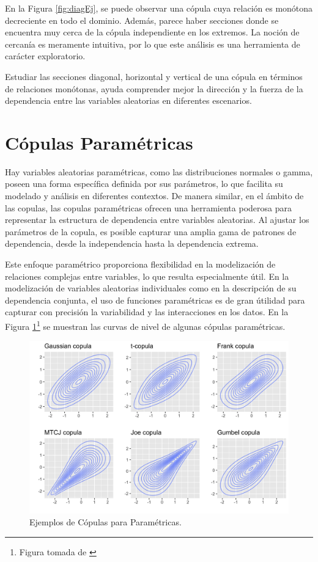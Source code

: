 En la Figura \ref{fig:diagEj}, se puede observar una cópula cuya relación es monótona decreciente en todo el dominio. Además, parece haber secciones donde se encuentra muy cerca de la cópula independiente en los extremos. La noción de cercanía es meramente intuitiva, por lo que este análisis es una herramienta de carácter exploratorio.

Estudiar las secciones diagonal, horizontal y vertical de una cópula en términos de relaciones monótonas, ayuda comprender mejor la dirección y la fuerza de la dependencia entre las variables aleatorias en diferentes escenarios. 




\section{Cópulas Paramétricas}

Hay variables aleatorias paramétricas, como las distribuciones normales o gamma, poseen una forma específica definida por sus parámetros, lo que facilita su modelado y análisis en diferentes contextos. De manera similar, en el ámbito de las copulas, las copulas paramétricas ofrecen una herramienta poderosa para 
representar la estructura de dependencia entre variables aleatorias. Al ajustar los parámetros de la copula, es posible capturar una amplia gama de patrones de dependencia, desde la independencia hasta la dependencia extrema. 

Este enfoque paramétrico proporciona flexibilidad en la modelización de relaciones complejas entre variables, lo que resulta especialmente útil. En la modelización de variables aleatorias individuales como en la descripción de su dependencia conjunta, el uso de funciones paramétricas es de gran útilidad para capturar con precisión la variabilidad y las interacciones en los datos. En la Figura \ref{fig:Parametric}\footnote{Figura tomada de \cite{ImgCopulas}} se muestran las curvas de nivel de algunas cópulas paramétricas.

\begin{figure}[H]
    \centering
    \includegraphics[width = 0.7 \textwidth]{Imagenes/parametricCopulas.png}
    \caption{Ejemplos de Cópulas para Paramétricas.}
    \label{fig:Parametric}
\end{figure}

